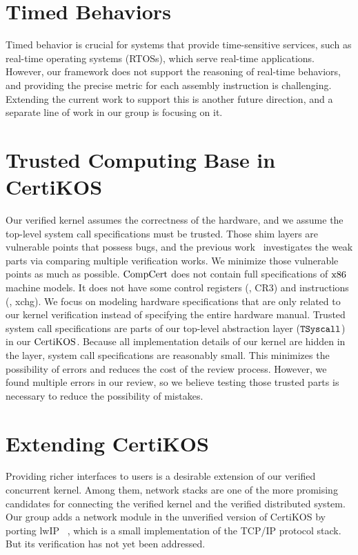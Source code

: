 \section{Timed Behaviors}

Timed behavior is crucial for systems that provide time-sensitive services, such as real-time operating systems (RTOSs), 
which serve real-time applications. However, our framework does not support the reasoning of real-time behaviors, 
and providing the precise metric for each assembly instruction is challenging. Extending the current work to support 
this is another future direction, and a separate line of work in our group is focusing on it.


\section{Trusted Computing Base in CertiKOS}

Our verified kernel assumes the correctness of the hardware, and we assume the top-level system call specifications must be trusted. 
Those shim layers are vulnerable points that possess bugs, and the previous work~\cite{shimlayer} investigates the weak parts via comparing 
multiple verification works. We minimize those vulnerable points as much as possible. 
$\mathrm{CompCert}$ does not contain full specifications of $\mathrm{x86}$ machine models.
It does not have some control registers (\eg, CR3) and 
instructions (\eg, xchg).
We focus on modeling hardware specifications that are only related to our kernel verification instead of specifying the entire hardware manual. 
Trusted system call specifications are parts of our top-level abstraction layer (${{\mathrm{\texttt{TSyscall}}}}$) in our $\mathrm{CertiKOS}$.
Because all implementation details of our kernel are hidden in the layer, system call specifications are reasonably small. 
This minimizes the possibility of errors and reduces the cost of the review process. However, we found multiple errors 
in our review, so we believe testing those trusted parts is necessary to reduce the possibility of mistakes.

\section{Extending CertiKOS}

Providing richer interfaces to users is a desirable extension of our verified concurrent kernel. Among them, network stacks are 
one of the more promising candidates for connecting the verified kernel and the verified distributed system. 
Our group adds a network module in the unverified 
version of CertiKOS by porting lwIP ~\cite{lwip},  which is a small implementation of the TCP/IP protocol stack. 
But its verification has not yet been addressed.


